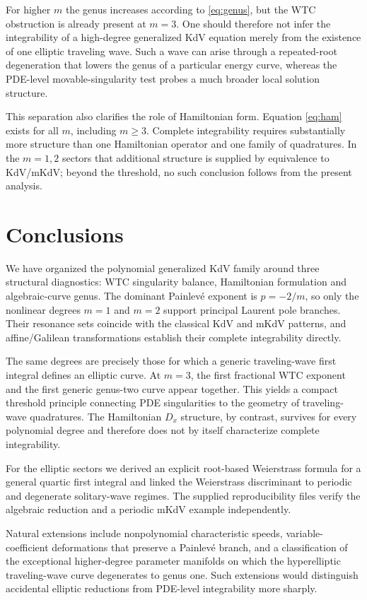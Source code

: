 \documentclass[11pt]{article}
\begin{document}
For higher $m$ the genus increases according to \eqref{eq:genus}, but the WTC obstruction is already present at $m=3$.  One should therefore not infer the integrability of a high-degree generalized KdV equation merely from the existence of one elliptic traveling wave.  Such a wave can arise through a repeated-root degeneration that lowers the genus of a particular energy curve, whereas the PDE-level movable-singularity test probes a much broader local solution structure.

This separation also clarifies the role of Hamiltonian form.  Equation \eqref{eq:ham} exists for all $m$, including $m\ge3$.  Complete integrability requires substantially more structure than one Hamiltonian operator and one family of quadratures.  In the $m=1,2$ sectors that additional structure is supplied by equivalence to KdV/mKdV; beyond the threshold, no such conclusion follows from the present analysis.

\section{Conclusions}
We have organized the polynomial generalized KdV family around three structural diagnostics: WTC singularity balance, Hamiltonian formulation and algebraic-curve genus.  The dominant Painlev\'e exponent is $p=-2/m$, so only the nonlinear degrees $m=1$ and $m=2$ support principal Laurent pole branches.  Their resonance sets coincide with the classical KdV and mKdV patterns, and affine/Galilean transformations establish their complete integrability directly.

The same degrees are precisely those for which a generic traveling-wave first integral defines an elliptic curve.  At $m=3$, the first fractional WTC exponent and the first generic genus-two curve appear together.  This yields a compact threshold principle connecting PDE singularities to the geometry of traveling-wave quadratures.  The Hamiltonian $D_x$ structure, by contrast, survives for every polynomial degree and therefore does not by itself characterize complete integrability.

For the elliptic sectors we derived an explicit root-based Weierstrass formula for a general quartic first integral and linked the Weierstrass discriminant to periodic and degenerate solitary-wave regimes.  The supplied reproducibility files verify the algebraic reduction and a periodic mKdV example independently.

Natural extensions include nonpolynomial characteristic speeds, variable-coefficient deformations that preserve a Painlev\'e branch, and a classification of the exceptional higher-degree parameter manifolds on which the hyperelliptic traveling-wave curve degenerates to genus one.  Such extensions would distinguish accidental elliptic reductions from PDE-level integrability more sharply.
\end{document}

